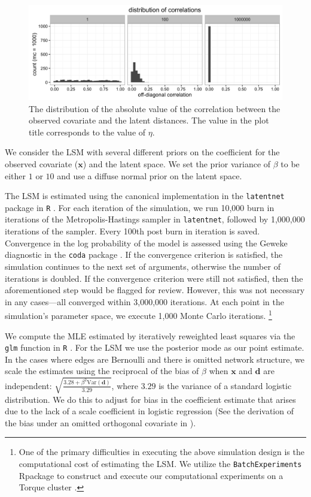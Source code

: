 \documentclass[11pt]{article}
\newcommand{\R}{\textsf{R}\space} %
\begin{document}
\begin{figure}
\includegraphics[width=\textwidth]{figures/max_r_vine.png}
\caption{The distribution of the absolute value of the correlation between the observed covariate and the latent distances. The value in the plot title corresponds to the value of $\eta$. \label{fig:vine}}
\end{figure}

We consider the LSM with several different priors on the coefficient
for the observed covariate ($\mathbf{x}$) and the latent space. We set the prior
variance of $\beta$ to be either $1$ or $10$ and use a diffuse normal
prior on the latent space.

The LSM is estimated using the canonical implementation in the
\texttt{latentnet} package in \texttt{R} \citep{latentnet}. For each
iteration of the simulation, we run 10,000 burn in iterations of the Metropolis-Hastings sampler in \texttt{latentnet},
followed by 1,000,000 iterations of the sampler. Every 100th post burn
in iteration is saved. Convergence in the log probability of the model
is assessed using the Geweke diagnostic in the \texttt{coda} package
\citep{coda, geweke1991evaluating}. If the convergence criterion is
satisfied, the simulation continues to the next set of arguments,
otherwise the number of iterations is doubled. If the convergence
criterion were still not satisfied, then the aforementioned step would be flagged for review. However, this was not necessary in
any cases---all converged within 3,000,000 iterations. At each point in the simulation's parameter space, we
execute 1,000 Monte Carlo iterations. \footnote{One of the primary
  difficulties in executing the above simulation design is the
  computational cost of estimating the LSM. We utilize the
  \texttt{BatchExperiments} \R package to construct and execute our
  computational experiments on a Torque cluster
  \cite{bischl2015batchjobs}.}

We compute the MLE estimated by iteratively reweighted least squares
via the \texttt{glm} function in \texttt{R} \citep{rcore}. For the LSM
we use the posterior mode as our point estimate. In the cases where
edges are Bernoulli and there is omitted network structure, we scale
the estimates using the reciprocal of the bias of $\beta$ when
$\mathbf{x}$ and $\mathbf{d}$ are independent: $\sqrt{\frac{3.28 +
    \beta^2 \text{Var}(\mathbf{d})}{3.29}}$, where $3.29$ is the
variance of a standard logistic distribution. We do this to adjust for
bias in the coefficient estimate that arises due to the lack of a
scale coefficient in logistic regression (See the derivation of the
bias under an omitted orthogonal covariate in
\cite{mood2010logistic}).
\end{document}
